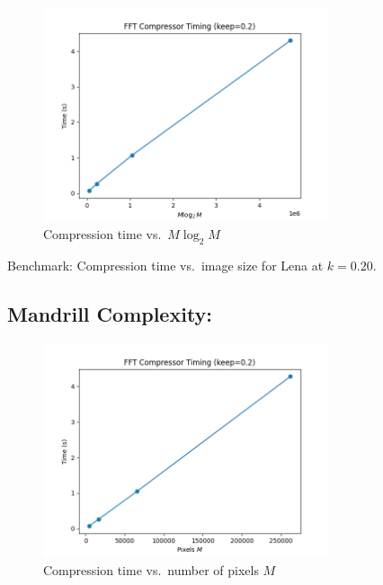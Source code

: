 \documentclass[12pt]{article}
\begin{document}
\begin{figure}[H]
  \centering
  \includegraphics[width=0.75\textwidth]{time_vs_MlogM_Lena.png}
  \caption{Compression time vs.\ $M\log_2M$}
  \label{fig:time-vs-MlogM}
\end{figure}

\begin{table}[H]
  \centering
  \caption{Benchmark: Compression time vs.\ image size for Lena at \(k=0.20\).}
\end{table}

\subsection{Mandrill Complexity:}

\begin{figure}[H]
  \centering
  \includegraphics[width=0.75\textwidth]{time_vs_M_Mandrill.png}
  \caption{Compression time vs.\ number of pixels $M$}
  \label{fig:time-vs-M}
\end{figure}
\end{document}
